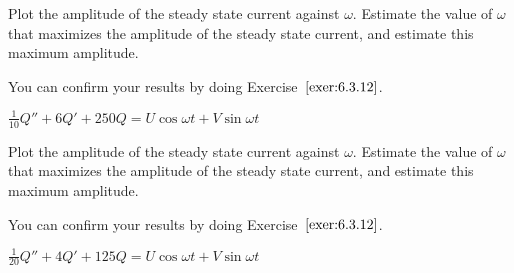 \documentclass{ximera}
\begin{document}
\begin{problem}\label{exer:6.3.16} Plot the
amplitude of the steady state current against $\omega$. Estimate the
value of $\omega$ that maximizes the amplitude of the steady state
current, and estimate this maximum amplitude. 
\begin{hint}
    You can confirm
your results by doing Exercise~$\ref{exer:6.3.12}$.
\end{hint}
$\frac{1}{10}Q''+6Q'+250Q=U\cos\omega t+V\sin\omega t$
\end{problem}

\begin{problem}\label{exer:6.3.17}
Plot the
amplitude of the steady state current against $\omega$. Estimate the
value of $\omega$ that maximizes the amplitude of the steady state
current, and estimate this maximum amplitude. 
\begin{hint}
    You can confirm
your results by doing Exercise~$\ref{exer:6.3.12}$.
\end{hint}
$\frac{1}{20}Q''+4Q'+125Q=U\cos\omega t+V\sin\omega t$
\end{problem}
\end{document}

